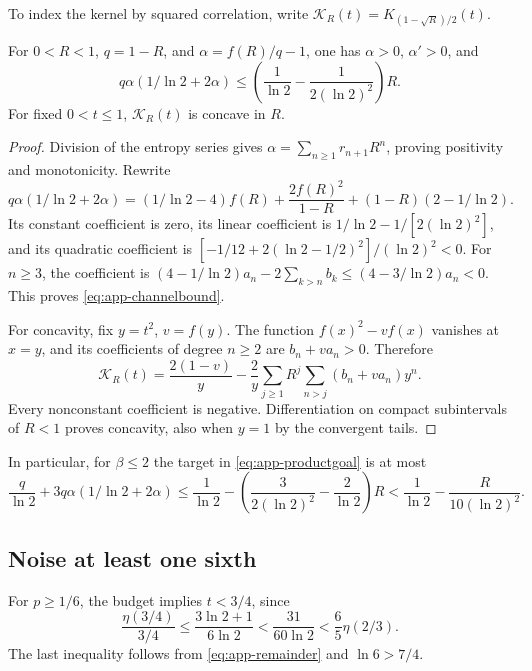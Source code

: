 To index the kernel by squared correlation, write
$\mathcal K_R(t)=K_{(1-\sqrt R)/2}(t)$.
\begin{lemma}\label{lem:app-channel}
For $0<R<1$, $q=1-R$, and $\alpha=f(R)/q-1$, one has $\alpha>0$, $\alpha' >0$, and
\begin{equation}\label{eq:app-channelbound}
 q\alpha(1/\ln2+2\alpha)\le\left(\frac1{\ln2}-\frac1{2(\ln2)^2}\right)R.
\end{equation}
For fixed $0<t\le1$, $\mathcal K_R(t)$ is concave in $R$.
\end{lemma}
\begin{proof}
Division of the entropy series gives $\alpha=\sum_{n\ge1}r_{n+1}R^n$, proving
positivity and monotonicity. Rewrite
\[
 q\alpha(1/\ln2+2\alpha)=(1/\ln2-4)f(R)+\frac{2f(R)^2}{1-R}
 +(1-R)(2-1/\ln2).
\]
Its constant coefficient is zero, its linear coefficient is $1/\ln2-1/[2(\ln2)^2]$, and its
quadratic coefficient is $[-1/12+2(\ln2-1/2)^2]/(\ln2)^2<0$. For $n\ge3$, the coefficient is
$(4-1/\ln2)a_n-2\sum_{k>n}b_k\le(4-3/\ln2)a_n<0$. This proves
\eqref{eq:app-channelbound}.

For concavity, fix $y=t^2$, $v=f(y)$. The function $f(x)^2-vf(x)$ vanishes at
$x=y$, and its coefficients of degree $n\ge2$ are $b_n+va_n>0$. Therefore
\[
 \mathcal K_R(t)=\frac{2(1-v)}y
 -\frac2y\sum_{j\ge1}R^j\sum_{n>j}(b_n+va_n)y^n.
\]
Every nonconstant coefficient is negative. Differentiation on compact
subintervals of $R<1$ proves concavity, also when $y=1$ by the convergent
tails.
\end{proof}
In particular, for $\beta\le2$ the target in \eqref{eq:app-productgoal} is at most
\begin{equation}\label{eq:app-targetcap}
 \frac q{\ln2}+3q\alpha(1/\ln2+2\alpha)
 \le\frac1{\ln2}-\left(\frac3{2(\ln2)^2}-\frac2{\ln2}\right)R
 <\frac1{\ln2}-\frac R{10(\ln2)^2}.
\end{equation}

\subsection{Noise at least one sixth}
For $p\ge1/6$, the budget implies $t<3/4$, since
\[
 \frac{\eta(3/4)}{3/4}\le\frac{3\ln2+1}{6\ln2}<\frac{31}{60\ln2}
 <\frac65\eta(2/3).
\]
The last inequality follows from \eqref{eq:app-remainder} and
$\ln6>7/4$.

